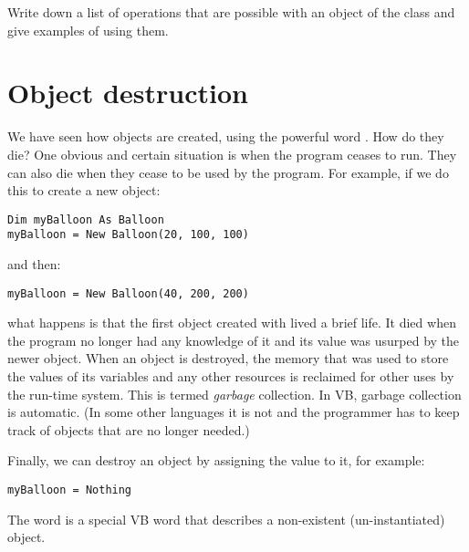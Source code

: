		\begin{stqb}
			\begin{STQ}
				\item Write down a list of operations that are possible with an object of the class  and give examples of using them.
			\end{STQ}
		\end{stqb}


	\section{Object destruction}
		We have seen how objects are created, using the powerful word . How do they die? One obvious and certain situation is when the program ceases to run. They can also die when they cease to be used by the program. For example, if we do this to create a new object:
		\begin{lstlisting}
Dim myBalloon As Balloon
myBalloon = New Balloon(20, 100, 100)
		\end{lstlisting}
		and then:
		\begin{lstlisting}
myBalloon = New Balloon(40, 200, 200)
		\end{lstlisting}
		what happens is that the first object created with  lived a brief life. It died when the program no longer had any knowledge of it and its value was usurped by the newer object. When an object is destroyed, the memory that was used to store the values of its variables and any other resources is reclaimed for other uses by the run-time system. This is termed \emph{garbage} collection. In VB, garbage collection is automatic. (In some other languages it is not and the programmer has to keep track of objects that are no longer needed.)
		
		Finally, we can destroy an object by assigning the value  to it, for example:
		\begin{lstlisting}
myBalloon = Nothing
		\end{lstlisting}
		The word  is a special VB word that describes a non-existent (un-instantiated) object.


